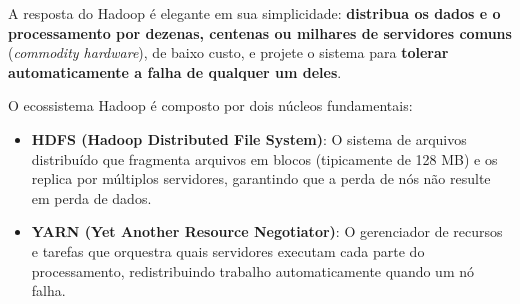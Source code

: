 \documentclass[12pt,a4paper]{report}
\begin{document}
A resposta do Hadoop é elegante em sua simplicidade: \textbf{distribua os
dados e o processamento por dezenas, centenas ou milhares de servidores
comuns} (\textit{commodity hardware}), de baixo custo, e projete o sistema
para \textbf{tolerar automaticamente a falha de qualquer um deles}.

O ecossistema Hadoop é composto por dois núcleos fundamentais:

\begin{itemize}
    \item \textbf{HDFS (Hadoop Distributed File System)}: O sistema de arquivos
    distribuído que fragmenta arquivos em blocos (tipicamente de 128 MB) e os
    replica por múltiplos servidores, garantindo que a perda de nós não resulte
    em perda de dados.

    \vspace{0.3cm}
    \begin{center}
    \end{center}

    \item \textbf{YARN (Yet Another Resource Negotiator)}: O gerenciador de
    recursos e tarefas que orquestra quais servidores executam cada parte do
    processamento, redistribuindo trabalho automaticamente quando um nó falha.


\end{itemize}
\end{document}
